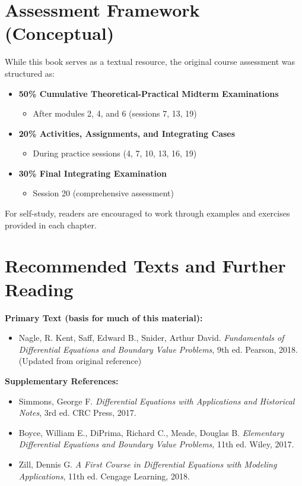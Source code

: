 \documentclass[12pt, letterpaper]{book}
\begin{document}
\appendix
\chapter{Assessment Framework (Conceptual)}
\label{app:assessment}
While this book serves as a textual resource, the original course assessment was structured as:
\begin{itemize}
    \item \textbf{50\% Cumulative Theoretical-Practical Midterm Examinations}
    \begin{itemize}
        \item After modules 2, 4, and 6 (sessions 7, 13, 19)
    \end{itemize}

    \item \textbf{20\% Activities, Assignments, and Integrating Cases}
    \begin{itemize}
        \item During practice sessions (4, 7, 10, 13, 16, 19)
    \end{itemize}

    \item \textbf{30\% Final Integrating Examination}
    \begin{itemize}
        \item Session 20 (comprehensive assessment)
    \end{itemize}
\end{itemize}
For self-study, readers are encouraged to work through examples and exercises provided in each chapter.

\chapter{Recommended Texts and Further Reading}
\label{app:texts}
\textbf{Primary Text (basis for much of this material):}
\begin{itemize}
    \item Nagle, R. Kent, Saff, Edward B., Snider, Arthur David. \textit{Fundamentals of Differential Equations and Boundary Value Problems}, 9th ed. Pearson, 2018. (Updated from original reference)
\end{itemize}

\textbf{Supplementary References:}
\begin{itemize}
    \item Simmons, George F. \textit{Differential Equations with Applications and Historical Notes}, 3rd ed. CRC Press, 2017.
    \item Boyce, William E., DiPrima, Richard C., Meade, Douglas B. \textit{Elementary Differential Equations and Boundary Value Problems}, 11th ed. Wiley, 2017.
    \item Zill, Dennis G. \textit{A First Course in Differential Equations with Modeling Applications}, 11th ed. Cengage Learning, 2018.
\end{itemize}
\end{document}
